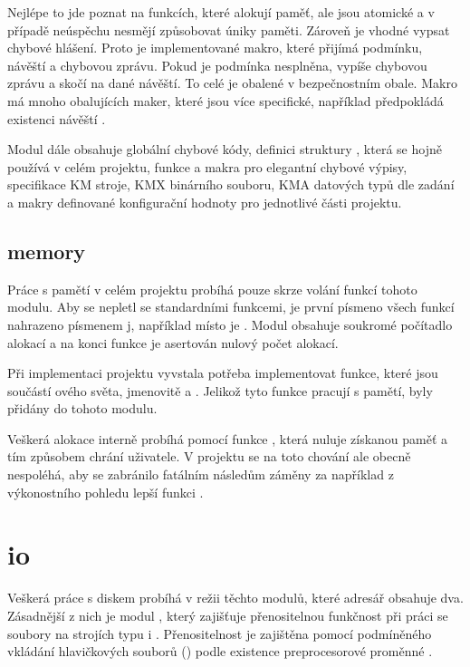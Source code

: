 \documentclass[czech, kiv, he, sem, pdf, viewonly]{fasthesis}
\begin{document}


Nejlépe to jde poznat na funkcích, které alokují paměť, ale jsou atomické a v
případě neúspěchu nesmějí způsobovat úniky paměti. Zároveň je vhodné vypsat
chybové hlášení. Proto je implementované makro, které přijímá podmínku, návěští
a chybovou zprávu. Pokud je podmínka nesplněna, vypíše chybovou zprávu a skočí
na dané návěští. To celé je obalené v bezpečnostním 
obale. Makro má mnoho obalujících maker, které jsou více specifické, například
 předpokládá existenci návěští .



Modul  dále obsahuje globální chybové kódy, definici struktury
, která se hojně používá v celém projektu, funkce a makra pro
elegantní chybové výpisy, specifikace KM stroje, KMX binárního souboru, KMA
datových typů dle zadání a makry definované konfigurační hodnoty pro jednotlivé
části projektu.



\subsection{memory}

Práce s pamětí v celém projektu probíhá pouze skrze volání funkcí tohoto modulu.
Aby se nepletl se standardními funkcemi, je první písmeno všech funkcí nahrazeno
písmenem j, například místo  je . Modul obsahuje
soukromé počítadlo alokací a na konci funkce  je asertován nulový
počet alokací.

Při implementaci projektu vyvstala potřeba implementovat funkce, které jsou
součástí ového světa, jmenovitě  a
. Jelikož tyto funkce pracují s pamětí, byly přidány do tohoto
modulu.

Veškerá alokace interně probíhá pomocí funkce , která nuluje
získanou paměť a tím způsobem chrání uživatele. V projektu se na toto chování
ale obecně nespoléhá, aby se zabránilo fatálním následům záměny za například z
výkonostního pohledu lepší funkci .

\section{io}

Veškerá práce s diskem probíhá v režii těchto modulů, které adresář obsahuje
dva. Zásadnější z nich je modul , který zajišťuje
přenositelnou funkčnost při práci se soubory na strojích typu  i
. Přenositelnost je zajištěna pomocí podmíněného vkládání
hlavičkových souborů () podle existence preprocesorové
proměnné .
\end{document}
